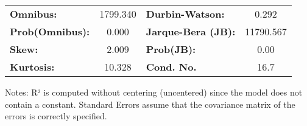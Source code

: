 \begin{center}
\begin{tabular}{lcccccc}
\bottomrule
\end{tabular}
\begin{tabular}{lclc}
\textbf{Omnibus:}       & 1799.340 & \textbf{  Durbin-Watson:     } &     0.292  \\
\textbf{Prob(Omnibus):} &   0.000  & \textbf{  Jarque-Bera (JB):  } & 11790.567  \\
\textbf{Skew:}          &   2.009  & \textbf{  Prob(JB):          } &      0.00  \\
\textbf{Kurtosis:}      &  10.328  & \textbf{  Cond. No.          } &      16.7  \\
\bottomrule
\end{tabular}
\end{center}

Notes: \newline
 [1] R² is computed without centering (uncentered) since the model does not contain a constant. \newline
 [2] Standard Errors assume that the covariance matrix of the errors is correctly specified.